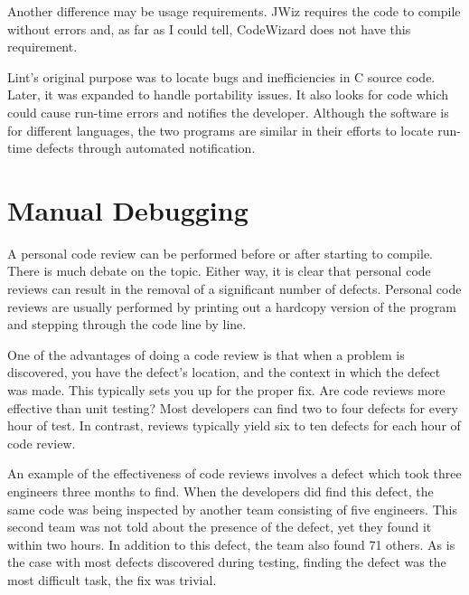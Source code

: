 Another difference may be usage requirements.  JWiz requires the code to
compile without errors and, as far as I could tell, CodeWizard does not
have this requirement.

Lint's original purpose was to locate bugs and inefficiencies in C source
code.  Later, it was expanded to handle portability issues.  It also looks
for code which could cause run-time errors and notifies the developer.
Although the software is for different languages, the two programs are
similar in their efforts to locate run-time defects through automated
notification.

\section{Manual Debugging}

A personal code review can be performed before or after starting to
compile.  There is much debate on the topic.  Either way, it is clear that
personal code reviews can result in the removal of a significant number of
defects.  Personal code reviews are usually performed by printing out a
hardcopy version of the program and stepping through the code line by line.

One of the advantages of doing a code review is that when a problem is
discovered, you have the defect's location, and the context in which the
defect was made.  This typically sets you up for the proper fix.  Are code
reviews more effective than unit testing?  Most developers can find two to four
defects for every hour of test.  In contrast, reviews typically yield six to
ten defects for each hour of code review\cite{Humphrey97}.

An example of the effectiveness of code reviews involves a defect which
took three engineers three months to find.  When the developers did find
this defect, the same code was being inspected by another team consisting
of five engineers.  This second team was not told about the presence of the
defect, yet they found it within two hours.  In addition to this defect,
the team also found 71 others.  As is the case with most defects discovered 
during testing, finding the defect was the most difficult task, the fix was
trivial\cite{Humphrey95}.

